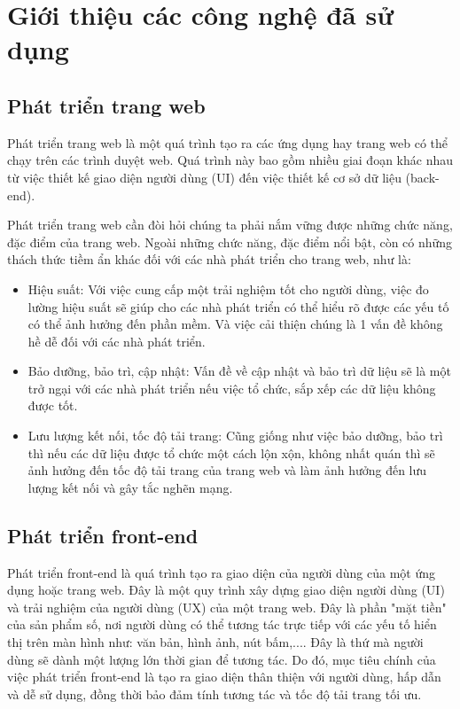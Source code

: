 \chapter{Giới thiệu các công nghệ đã sử dụng}


\section{Phát triển trang web}

Phát triển trang web là một quá trình tạo ra các ứng dụng hay trang web có thể chạy trên các trình duyệt web. Quá trình này bao gồm nhiều giai đoạn khác nhau từ việc thiết kế giao diện người dùng (UI) đến việc thiết kế cơ sở dữ liệu (back-end).

Phát triển trang web cần đòi hỏi chúng ta phải nắm vững được những chức năng, đặc điểm của trang web. Ngoài những chức năng, đặc điểm nổi bật, còn có những thách thức tiềm ẩn khác đối với các nhà phát triển cho trang web, như là:

\begin{itemize}
    \item Hiệu suất: Với việc cung cấp một trải nghiệm tốt cho người dùng, việc đo lường hiệu suất sẽ giúp cho các nhà phát triển có thể hiểu rõ được các yếu tố có thể ảnh hưởng đến phần mềm. Và việc cải thiện chúng là 1 vấn đề không hề dễ đối với các nhà phát triển.
    \item Bảo dưỡng, bảo trì, cập nhật: Vấn đề về cập nhật và bảo trì dữ liệu sẽ là một trở ngại với các nhà phát triển nếu việc tổ chức, sắp xếp các dữ liệu không được tốt.
    \item Lưu lượng kết nối, tốc độ tải trang: Cũng giống như việc bảo dưỡng, bảo trì thì nếu các dữ liệu được tổ chức một cách lộn xộn, không nhất quán thì sẽ ảnh hưởng đến tốc độ tải trang của trang web và làm ảnh hưởng đến lưu lượng kết nối và gây tắc nghẽn mạng.
\end{itemize}

\section{Phát triển front-end}
Phát triển front-end là quá trình tạo ra giao diện của người dùng của một ứng dụng hoặc trang web. Đây là một quy trình xây dựng giao diện người dùng (UI) và trải nghiệm của người dùng (UX) của một trang web. Đây là phần "mặt tiền" của sản phẩm số, nơi người dùng có thể tương tác trực tiếp với các yếu tố hiển thị trên màn hình như: văn bản, hình ảnh, nút bấm,.... Đây là thứ mà người dùng sẽ dành một lượng lớn thời gian để tương tác. Do đó, mục tiêu chính của việc phát triển front-end là tạo ra giao diện thân thiện với người dùng, hấp dẫn và dễ sử dụng, đồng thời bảo đảm tính tương tác và tốc độ tải trang tối ưu.

